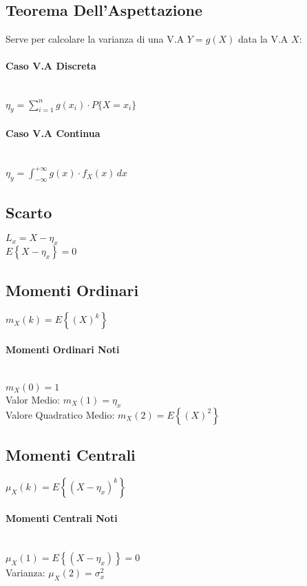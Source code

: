 \documentclass{article}
\begin{document}
\subsection{Teorema Dell'Aspettazione}
Serve per calcolare la varianza di una V.A $Y = g(X)$ data la V.A $X$: 

\paragraph{Caso V.A Discreta} ~\\
$\eta_y = \sum_{i = 1}^{n} g(x_i) \cdot P \big\{ X = x_i \big\} $

\paragraph{Caso V.A Continua} ~\\
$\eta_y = \int_{- \infty}^{+\infty} g(x) \cdot f_X(x) \,dx $

\subsection{Scarto}
$L_x = X - \eta_x $ \\
$E \left\{ X - \eta_x \right\} = 0$

\subsection{Momenti Ordinari}
$m_X(k) = E \left\{ (X)^k \right\}$

\paragraph{Momenti Ordinari Noti} ~\\
$m_X(0) = 1 $ \\
Valor Medio: $m_X(1) = \eta_x $ \\
Valore Quadratico Medio: $m_X(2) = E \left\{ (X)^2 \right\} $

\subsection{Momenti Centrali}
$\mu_X(k) = E \left\{ (X - \eta_x )^k \right\}$

\paragraph{Momenti Centrali Noti} ~\\
$\mu_X(1) = E \left\{ (X - \eta_x )\right\} = 0 $ \\
Varianza: $\mu_X(2) = \sigma_x^2$
\end{document}
